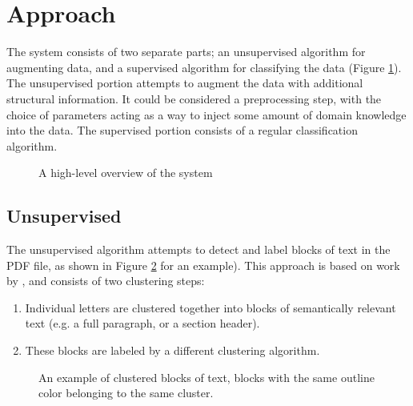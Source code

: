 \section*{Approach}

The system consists of two separate parts; an unsupervised algorithm for
augmenting data, and a supervised algorithm for classifying the data (Figure
\ref{fig:overview}). The unsupervised portion attempts to augment the data with
additional structural information. It could be considered a preprocessing step,
with the choice of parameters acting as a way to inject some amount of domain
knowledge into the data. The supervised portion consists of a regular
classification algorithm.

\begin{figure}[htbp]
  \centering
  \caption{A high-level overview of the system}
  \label{fig:overview}
\end{figure}

\subsection*{Unsupervised}
The unsupervised algorithm attempts to detect and label blocks of text in the
PDF file, as shown in Figure \ref{fig:clustered} for an example). This approach
is based on work by \textcite{klampfl2014unsupervised}, and consists of two
clustering steps:
\begin{enumerate}
\item Individual letters are clustered together into blocks of semantically
  relevant text (e.g. a full paragraph, or a section header).
\item These blocks are labeled by a different clustering algorithm.
\end{enumerate}

\begin{figure}[htbp]
  \centering
  \caption{An example of clustered blocks of text, blocks with the same outline
    color belonging to the same cluster.}
  \label{fig:clustered}
\end{figure}

